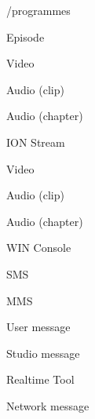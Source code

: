 \documentclass[a4paper, 11pt]{scrreprt}
\begin{document}
\begin{tystrul}


\item /programmes

\begin{tystrul}


\item Episode

\item Video

\item Audio (clip)

\item Audio (chapter)

\end{tystrul}



\item ION Stream

\begin{tystrul}


\item Video

\item Audio (clip)

\item Audio (chapter)

\end{tystrul}



\item WIN Console

\begin{tystrul}


\item SMS

\item MMS

\item User message

\item Studio message

\end{tystrul}



\item Realtime Tool

\begin{tystrul}


\item Network message

\end{tystrul}




\end{tystrul}
\end{document}
